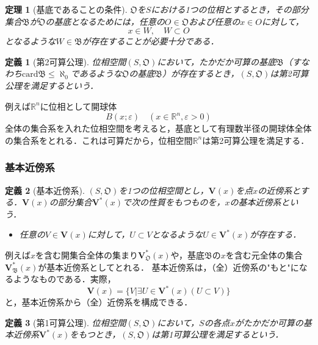 \documentclass[a4paper,10pt,uplatex]{jsarticle}
\numberwithin{equation}{section}
\theoremstyle{mystyle}
\newtheorem{dfn}{定義}[section]
\newtheorem{thm}{定理}[section]
\newcommand{\gB}{\mathfrak{B}}
\newcommand{\gO}{\mathfrak{O}}
\begin{document}
\begin{thm}[基底であることの条件]
    $\gO$を$S$における1つの位相とするとき，その部分集合$\gB$が$\gO$の基底となるためには，任意の$O\in\gO$および任意の$x\in O$に対して，
    \begin{equation}
        x \in W, \quad W \subset O
    \end{equation}
    となるような$W \in \gB$が存在することが必要十分である．
\end{thm}

\begin{dfn}[第2可算公理]
    位相空間$(S,\gO)$において，たかだか可算の基底$\gB$（すなわち$\mathrm{card}\gB \leq \aleph_0$であるような$\gO$の基底$\gB$）が存在するとき，$(S,\gO)$は第2可算公理を満足するという．
\end{dfn}

例えば$\mathbb{R}^n$に位相として開球体
\begin{equation}
    B(x;\varepsilon) \quad (x \in \mathbb{R}^n, \varepsilon > 0)
\end{equation}
全体の集合系を入れた位相空間を考えると，基底として有理数半径の開球体全体の集合系をとれる．これは可算だから，位相空間$\mathbb{R}^n$は第2可算公理を満足する．

\subsubsection{基本近傍系}
\begin{dfn}[基本近傍系]
    $(S,\gO)$を1つの位相空間とし，$\bm{V}(x)$を点$x$の近傍系とする．$\bm{V}(x)$の部分集合$\bm{V}^*(x)$で次の性質をもつものを，$x$の基本近傍系という．
    \begin{itemize}
        \item[] 任意の$V \in \bm{V}(x)$に対して，$U \subset V$となるような$U \in \bm{V}^*(x)$が存在する．
    \end{itemize}
\end{dfn}
例えば$x$を含む開集合全体の集まり$\bm{V}_\gO^*(x)$や，基底$\gB$の$x$を含む元全体の集合$\bm{V}_\gB^*(x)$が基本近傍系としてとれる．
基本近傍系は，（全）近傍系の"もと"になるようなものである．実際，
\begin{equation}
    \bm{V}(x) = \{V | \exists U \in \bm{V}^*(x) (U \subset V)\}
\end{equation}
と，基本近傍系から（全）近傍系を構成できる．

\begin{dfn}[第1可算公理]
    位相空間$(S,\gO)$において，$S$の各点$x$がたかだか可算の基本近傍系$\bm{V}^*(x)$をもつとき，$(S,\gO)$は第1可算公理を満足するという．
\end{dfn}
\end{document}
